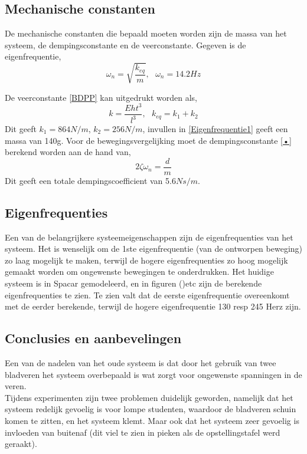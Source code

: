 \documentclass[a4paper]{article}
\begin{document}
\subsection{Mechanische constanten}

De mechanische constanten die bepaald moeten worden zijn de massa van het systeem, de dempingsconstante en de veerconstante. Gegeven is de eigenfrequentie,\\ 

\begin{equation}
\omega_n=\sqrt{\frac{k_{eq}}{m}}, \ \ \ \omega_n=14.2Hz
\label{Eigenfrequentie1}
\end{equation}

De veerconstante \ref{BDPP} kan uitgedrukt worden als,
\begin{equation}
k=\frac{Eht^3}{l^3}, \ \ \ k_{eq}=k_1+k_2
\label{Veerstijfheid} 
\end{equation} 
Dit geeft $k_1=864$$N/m$, $k_2=256$$N/m$, invullen in \ref{Eigenfrequentie1} geeft een massa van 140g. Voor de bewegingsvergelijking moet de dempingsconstante \ref{•} berekend worden aan de hand van,
\begin{equation}
2\zeta\omega_n=\frac{d}{m}
\end{equation} 
Dit geeft een totale dempingscoefficient van 5.6$Ns/m$.\\

\subsection{Eigenfrequenties}
Een van de belangrijkere systeemeigenschappen zijn de eigenfrequenties van het systeem. Het is wenselijk om de 1ste eigenfrequentie (van de ontworpen beweging) zo laag mogelijk te maken, terwijl de hogere eigenfrequenties zo hoog mogelijk gemaakt worden om ongewenste bewegingen te onderdrukken. Het huidige systeem is in Spacar gemodeleerd, en in figuren ()etc zijn de berekende eigenfrequenties te zien. Te zien valt dat de eerste eigenfrequentie overeenkomt met de eerder berekende, terwijl de hogere eigenfrequentie 130 resp 245 Herz zijn.
\subsection{Conclusies en aanbevelingen}
Een van de nadelen van het oude systeem is dat door het gebruik van twee bladveren het systeem overbepaald is wat zorgt voor ongewenste spanningen in de veren. \\ Tijdens experimenten zijn twee problemen duidelijk geworden, namelijk dat het systeem redelijk gevoelig is voor lompe studenten, waardoor de bladveren schuin komen te zitten, en het systeem klemt. Maar ook dat het systeem zeer gevoelig is invloeden van buitenaf (dit viel te zien in pieken als de opstellingstafel werd geraakt).  \\
\end{document}
